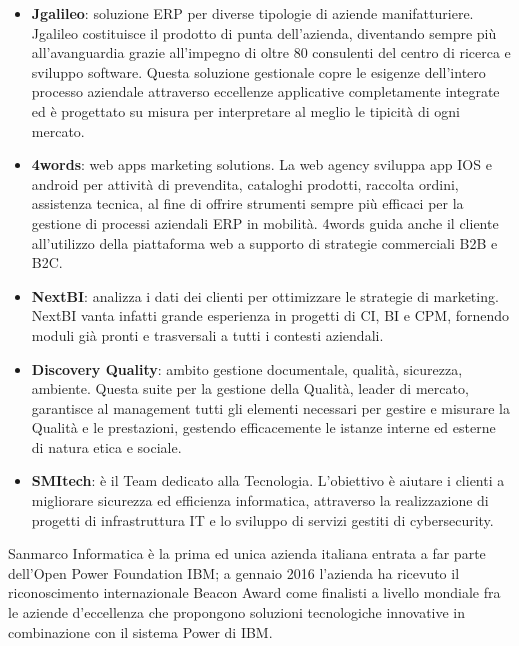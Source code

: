 \begin{itemize}
	\item \textbf{Jgalileo}: soluzione \acrshort{ERP} per diverse tipologie di aziende manifatturiere. Jgalileo costituisce il prodotto di punta dell'azienda, diventando sempre più all'avanguardia grazie all'impegno di oltre 80 consulenti del centro di ricerca e sviluppo software. Questa soluzione gestionale copre le esigenze dell'intero processo aziendale attraverso eccellenze applicative completamente integrate ed è progettato su misura per interpretare al meglio le tipicità di ogni mercato.
	
	\item \textbf{4words}: web apps marketing solutions. La web agency sviluppa app \gls{IOS} e \Gls{android} per attività di prevendita, cataloghi prodotti, raccolta ordini, assistenza tecnica, al fine di offrire strumenti sempre più efficaci per la gestione di processi aziendali ERP in mobilità. 4words guida anche il cliente all'utilizzo della piattaforma web a supporto di strategie commerciali \acrshort{B2B} e \acrshort{B2C}.
	
	\item \textbf{NextBI}: analizza i dati dei clienti per ottimizzare le strategie di marketing. NextBI vanta infatti grande esperienza in progetti di \gls{CI}, \Gls{BI} e \Gls{CPM}, fornendo moduli già pronti e trasversali a tutti i contesti aziendali.
	
	\item \textbf{Discovery Quality}: ambito gestione documentale, qualità, sicurezza, ambiente. Questa suite per la gestione della Qualità, leader di mercato, garantisce al management tutti gli elementi necessari per gestire e misurare la Qualità e le prestazioni, gestendo efficacemente le istanze interne ed esterne di natura etica e sociale.
	
	\item \textbf{SMItech}: è il Team dedicato alla Tecnologia. L'obiettivo è aiutare i clienti a migliorare sicurezza ed efficienza informatica, attraverso la realizzazione di progetti di infrastruttura IT e lo sviluppo di servizi gestiti di \Gls{cybersecurity}.
\end{itemize}
Sanmarco Informatica è la prima ed unica azienda italiana entrata a far parte dell'\Gls{Open Power Foundation IBM}; a gennaio 2016 l'azienda ha ricevuto il riconoscimento internazionale \Gls{Beacon Award} come finalisti a livello mondiale fra le aziende d'eccellenza che propongono soluzioni tecnologiche innovative in combinazione con il sistema \Gls{Power} di IBM.

